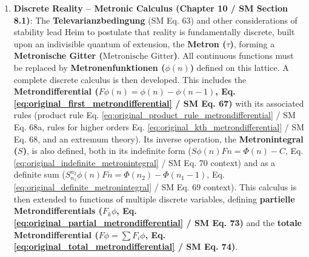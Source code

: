 \documentclass[
    12pt,              %
    a4paper,           %
    headings=normal,   %
    twoside=true,      %
    BCOR=8mm,          %
]{scrbook}
\newcommand{\metron}{\tau}
\newcommand{\metronischegitter}{\text{Metronische Gitter}}
\newcommand{\metrondifferential}{F}
\newcommand{\metronintegral}{S}
\newcommand{\metronenfunktion}{\phi(n)}
\newcommand{\metronenziffer}{n}
\begin{document}
\begin{enumerate}
    \item \textbf{Discrete Reality – Metronic Calculus (Chapter 10 / SM Section 8.1)}: The \textbf{Televarianzbedingung} (SM Eq. 63) and other considerations of stability lead Heim to postulate that reality is fundamentally discrete, built upon an indivisible quantum of extension, the \textbf{Metron (\( \metron \))}, forming a \textbf{Metronische Gitter (\(\metronischegitter\))}. All continuous functions must be replaced by \textbf{Metronenfunktionen (\( \metronenfunktion \))} defined on this lattice. A complete discrete calculus is then developed. This includes the \textbf{Metrondifferential (\( \metrondifferential\phi(\metronenziffer) = \phi(\metronenziffer) - \phi(\metronenziffer-1) \), Eq. \eqref{eq:original_first_metrondifferential} / SM Eq. 67)} with its associated rules (product rule Eq. \eqref{eq:original_product_rule_metrondifferential} / SM Eq. 68a, rules for higher orders Eq. \eqref{eq:original_kth_metrondifferential} / SM Eq. 68, and an extremum theory). Its inverse operation, the \textbf{Metronintegral (\( \metronintegral \))}, is also defined, both in its indefinite form (\( \metronintegral\phi(\metronenziffer)\metrondifferential\metronenziffer = \Phi(\metronenziffer)-C \), Eq. \eqref{eq:original_indefinite_metronintegral} / SM Eq. 70 context) and as a definite sum (\( \metronintegral_{n_1}^{n_2}\phi(\metronenziffer)\metrondifferential\metronenziffer = \Phi(n_2)-\Phi(n_1-1) \), Eq. \eqref{eq:original_definite_metronintegral} / SM Eq. 69 context). This calculus is then extended to functions of multiple discrete variables, defining \textbf{partielle Metrondifferentials (\( F_k\phi \), Eq. \eqref{eq:original_partial_metrondifferential} / SM Eq. 73)} and the \textbf{totale Metrondifferential (\( F\phi = \sum F_i\phi \), Eq. \eqref{eq:original_total_metrondifferential} / SM Eq. 74)}.


\end{enumerate}
\end{document}
